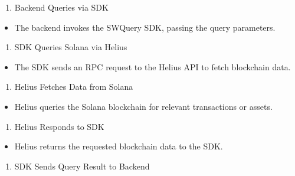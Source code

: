 \documentclass[
]{article}
\providecommand{\tightlist}{%
  \setlength{\itemsep}{0pt}\setlength{\parskip}{0pt}}
\begin{document}
\begin{enumerate}
\def\labelenumi{\arabic{enumi}.}
\setcounter{enumi}{3}
\tightlist
\item
  Backend Queries via SDK
\end{enumerate}

\begin{itemize}
\tightlist
\item
  The backend invokes the SWQuery SDK, passing the query parameters.
\end{itemize}

\begin{enumerate}
\def\labelenumi{\arabic{enumi}.}
\setcounter{enumi}{4}
\tightlist
\item
  SDK Queries Solana via Helius
\end{enumerate}

\begin{itemize}
\tightlist
\item
  The SDK sends an RPC request to the Helius API to fetch blockchain
  data.
\end{itemize}

\begin{enumerate}
\def\labelenumi{\arabic{enumi}.}
\setcounter{enumi}{5}
\tightlist
\item
  Helius Fetches Data from Solana
\end{enumerate}

\begin{itemize}
\tightlist
\item
  Helius queries the Solana blockchain for relevant transactions or
  assets.
\end{itemize}

\begin{enumerate}
\def\labelenumi{\arabic{enumi}.}
\setcounter{enumi}{6}
\tightlist
\item
  Helius Responds to SDK
\end{enumerate}

\begin{itemize}
\tightlist
\item
  Helius returns the requested blockchain data to the SDK.
\end{itemize}

\begin{enumerate}
\def\labelenumi{\arabic{enumi}.}
\setcounter{enumi}{7}
\tightlist
\item
  SDK Sends Query Result to Backend
\end{enumerate}
\end{document}
